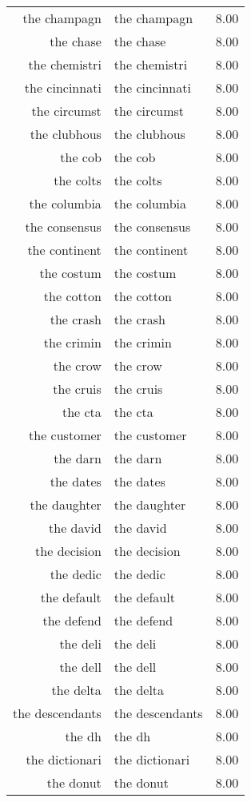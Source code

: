 \begin{table}[ht]
\begin{tabular}{rlr}
  the champagn & the champagn & 8.00 \\ 
  the chase & the chase & 8.00 \\ 
  the chemistri & the chemistri & 8.00 \\ 
  the cincinnati & the cincinnati & 8.00 \\ 
  the circumst & the circumst & 8.00 \\ 
  the clubhous & the clubhous & 8.00 \\ 
  the cob & the cob & 8.00 \\ 
  the colts & the colts & 8.00 \\ 
  the columbia & the columbia & 8.00 \\ 
  the consensus & the consensus & 8.00 \\ 
  the continent & the continent & 8.00 \\ 
  the costum & the costum & 8.00 \\ 
  the cotton & the cotton & 8.00 \\ 
  the crash & the crash & 8.00 \\ 
  the crimin & the crimin & 8.00 \\ 
  the crow & the crow & 8.00 \\ 
  the cruis & the cruis & 8.00 \\ 
  the cta & the cta & 8.00 \\ 
  the customer & the customer & 8.00 \\ 
  the darn & the darn & 8.00 \\ 
  the dates & the dates & 8.00 \\ 
  the daughter & the daughter & 8.00 \\ 
  the david & the david & 8.00 \\ 
  the decision & the decision & 8.00 \\ 
  the dedic & the dedic & 8.00 \\ 
  the default & the default & 8.00 \\ 
  the defend & the defend & 8.00 \\ 
  the deli & the deli & 8.00 \\ 
  the dell & the dell & 8.00 \\ 
  the delta & the delta & 8.00 \\ 
  the descendants & the descendants & 8.00 \\ 
  the dh & the dh & 8.00 \\ 
  the dictionari & the dictionari & 8.00 \\ 
  the donut & the donut & 8.00 \\ 

\end{tabular}
\end{table}
